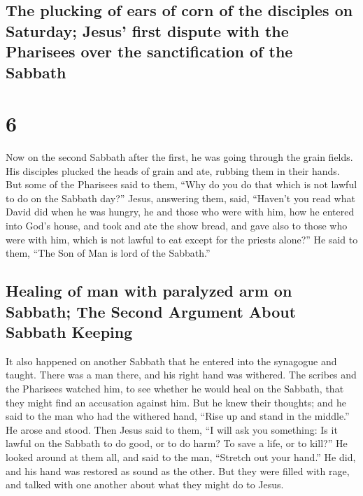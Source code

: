 \hypertarget{the-plucking-of-ears-of-corn-of-the-disciples-on-saturday-jesus-first-dispute-with-the-pharisees-over-the-sanctification-of-the-sabbath}{%
\subsection{The plucking of ears of corn of the disciples on Saturday;
Jesus' first dispute with the Pharisees over the sanctification of the
Sabbath}\label{the-plucking-of-ears-of-corn-of-the-disciples-on-saturday-jesus-first-dispute-with-the-pharisees-over-the-sanctification-of-the-sabbath}}

\hypertarget{section-5}{%
\section{6}\label{section-5}}

 Now on the second Sabbath after the first, he was going
through the grain fields. His disciples plucked the heads of grain and
ate, rubbing them in their hands.  But some of the
Pharisees said to them, ``Why do you do that which is not lawful to do
on the Sabbath day?''  Jesus, answering them, said,
``Haven't you read what David did when he was hungry, he and those who
were with him,  how he entered into God's house, and took
and ate the show bread, and gave also to those who were with him, which
is not lawful to eat except for the priests alone?''  He
said to them, ``The Son of Man is lord of the Sabbath.''

\hypertarget{healing-of-man-with-paralyzed-arm-on-sabbath-the-second-argument-about-sabbath-keeping}{%
\subsection{Healing of man with paralyzed arm on Sabbath; The Second
Argument About Sabbath
Keeping}\label{healing-of-man-with-paralyzed-arm-on-sabbath-the-second-argument-about-sabbath-keeping}}

 It also happened on another Sabbath that he entered into
the synagogue and taught. There was a man there, and his right hand was
withered.  The scribes and the Pharisees watched him, to
see whether he would heal on the Sabbath, that they might find an
accusation against him.  But he knew their thoughts; and
he said to the man who had the withered hand, ``Rise up and stand in the
middle.'' He arose and stood.  Then Jesus said to them,
``I will ask you something: Is it lawful on the Sabbath to do good, or
to do harm? To save a life, or to kill?''  He looked
around at them all, and said to the man, ``Stretch out your hand.'' He
did, and his hand was restored as sound as the other. 
But they were filled with rage, and talked with one another about what
they might do to Jesus.

